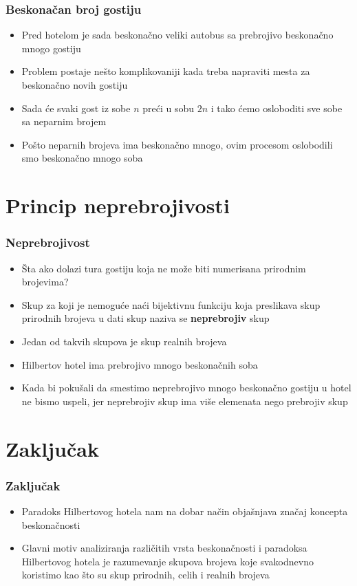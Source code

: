 \documentclass{beamer}
\begin{document}
\begin{frame}[fragile]\frametitle{Beskonačan broj gostiju}
\begin{itemize}
    \item Pred hotelom je sada beskonačno veliki autobus sa prebrojivo beskonačno mnogo gostiju
    \item Problem postaje nešto komplikovaniji kada treba napraviti mesta za beskonačno novih gostiju
    \item Sada će svaki gost iz sobe $n$ preći u sobu $2n$ i tako ćemo osloboditi sve sobe sa neparnim brojem
    \item Pošto neparnih brojeva ima beskonačno mnogo, ovim procesom oslobodili smo beskonačno mnogo soba
\end{itemize}
\end{frame}

\section{Princip neprebrojivosti}
\begin{frame}[fragile]\frametitle{Neprebrojivost}
\begin{itemize}
 \item Šta ako dolazi tura gostiju koja ne može biti numerisana prirodnim brojevima?
    \item Skup za koji je nemoguće naći bijektivnu funkciju koja preslikava skup prirodnih brojeva u dati skup naziva se \textbf{neprebrojiv} skup
    \item Jedan od takvih skupova je skup realnih brojeva
\end{itemize}
\begin{itemize}
    \item Hilbertov hotel ima prebrojivo mnogo beskonačnih soba
    \item Kada bi pokušali da smestimo neprebrojivo mnogo beskonačno gostiju u hotel ne bismo uspeli, jer neprebrojiv skup ima više elemenata nego prebrojiv skup
\end{itemize}
\end{frame}
\section{Zaključak}
\begin{frame}[fragile]\frametitle{Zaključak}
\begin{itemize}
 \item Paradoks Hilbertovog hotela nam na dobar način objašnjava značaj koncepta beskonačnosti
    \item Glavni motiv analiziranja različitih vrsta beskonačnosti i paradoksa Hilbertovog hotela je razumevanje
    skupova brojeva koje svakodnevno koristimo kao što su skup prirodnih, celih i realnih brojeva

\end{itemize}
\end{frame}
\end{document}
